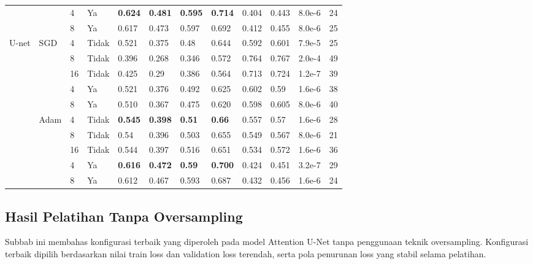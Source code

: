 \begin{landscape}
\begin{table}[]
\begin{tabular}{@{}llllllllllll@{}}
			&  & 4  & Ya    & \textbf{0.624} & \textbf{0.481} & \textbf{0.595} & \textbf{0.714} & 0.404 & 0.443  & 8.0e-6 & 24 \\
			&  & 8  & Ya    & 0.617          & 0.473          & 0.597          & 0.692          & 0.412 & 0.455  & 8.0e-6 & 25 \\ \midrule
			\multirow{10}{*}{U-net} &
			\multirow{5}{*}{SGD} &
			4 &
			Tidak &
			0.521 &
			0.375 &
			0.48 &
			0.644 &
			0.592 &
			0.601 &
			7.9e-5 &
			25 \\
			&  & 8  & Tidak & 0.396          & 0.268          & 0.346          & 0.572          & 0.764 & 0.767  & 2.0e-4 & 49 \\
			&  & 16 & Tidak & 0.425          & 0.29           & 0.386          & 0.564          & 0.713 & 0.724  & 1.2e-7 & 39 \\ \cmidrule(l){3-12} 
			&  & 4  & Ya    & 0.521          & 0.376          & 0.492          & 0.625          & 0.602 & 0.59   & 1.6e-6 & 38 \\
			&  & 8  & Ya    & 0.510          & 0.367          & 0.475          & 0.620          & 0.598 & 0.605  & 8.0e-6 & 40 \\ \cmidrule(l){2-12} 
			&
			\multirow{5}{*}{Adam} &
			4 &
			Tidak &
			\textbf{0.545} &
			\textbf{0.398} &
			\textbf{0.51} &
			\textbf{0.66} &
			0.557 &
			0.57 &
			1.6e-6 &
			28 \\
			&  & 8  & Tidak & 0.54           & 0.396          & 0.503          & 0.655          & 0.549 & 0.567  & 8.0e-6 & 21 \\
			&  & 16 & Tidak & 0.544          & 0.397          & 0.516          & 0.651          & 0.534 & 0.572  & 1.6e-6 & 36 \\ \cmidrule(l){3-12} 
			&  & 4  & Ya    & \textbf{0.616} & \textbf{0.472} & \textbf{0.59}  & \textbf{0.700} & 0.424 & 0.451  & 3.2e-7 & 29 \\
			&  & 8  & Ya    & 0.612          & 0.467          & 0.593          & 0.687          & 0.432 & 0.456  & 1.6e-6 & 24 \\ \bottomrule
		\end{tabular}
	\end{table}
\end{landscape}

\subsection{Hasil Pelatihan Tanpa Oversampling}

\noindent Subbab ini membahas konfigurasi terbaik yang diperoleh pada model Attention U-Net tanpa penggunaan teknik oversampling. Konfigurasi terbaik dipilih berdasarkan nilai train loss dan validation loss terendah, serta pola penurunan loss yang stabil selama pelatihan.

